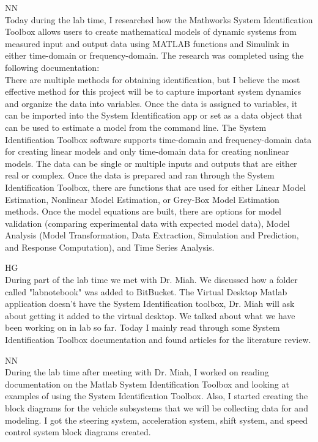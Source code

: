 \documentclass[fontsize=11pt, %
                             paper=letter, %
                             openany, %
                             captions=tableheading,
                             index=totoc,
                             hyperref]{labbook}
\def\currentYear{2021}
\begin{document}
\begin{addmargin}[0cm]{0cm}
NN\\
Today during the lab time, I researched how the Mathworks System Identification Toolbox allows users to create mathematical models of dynamic systems from measured input and output data using MATLAB functions and Simulink in either time-domain or frequency-domain. The research was completed using the following documentation: \href{https://www.mathworks.com/help/ident/getting-started-1.html} \\
There are multiple methods for obtaining identification, but I believe the most effective method for this project will be to capture important system dynamics and organize the data into variables. Once the data is assigned to variables, it can be imported into the System Identification app or set as a data object that can be used to estimate a model from the command line. The System Identification Toolbox software supports time-domain and frequency-domain data for creating linear models and only time-domain data for creating nonlinear models. The data can be single or multiple inputs and outputs that are either real or complex. Once the data is prepared and ran through the System Identification Toolbox, there are functions that are used for either Linear Model Estimation, Nonlinear Model Estimation, or Grey-Box Model Estimation methods. Once the model equations are built, there are options for model validation (comparing experimental data with expected model data), Model Analysis (Model Transformation, Data Extraction, Simulation and Prediction, and Response Computation), and Time Series Analysis.



\labday{Tuesday, September 28, \currentYear}
HG\\
During part of the lab time we met with Dr. Miah. We discussed how a folder called "labnotebook" was added to BitBucket. The Virtual Desktop Matlab application doesn't have the System Identification toolbox, Dr. Miah will ask about getting it added to the virtual desktop. We talked about what we have been working on in lab so far. Today I mainly read through some System Identification Toolbox documentation and found articles for the literature review. 

NN\\
During the lab time after meeting with Dr. Miah, I worked on reading documentation on the Matlab System Identification Toolbox and looking at examples of using the System Identification Toolbox. Also, I started creating the block diagrams for the vehicle subsystems that we will be collecting data for and modeling. I got the steering system, acceleration system, shift system, and speed control system block diagrams created. 


\end{addmargin}
\end{document}
